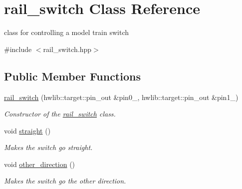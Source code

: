\hypertarget{classrail__switch}{}\section{rail\+\_\+switch Class Reference}
\label{classrail__switch}


class for controlling a model train switch  




{\ttfamily \#include $<$rail\+\_\+switch.\+hpp$>$}

\subsection*{Public Member Functions}
\begin{DoxyCompactItemize}
\item 
\hyperlink{classrail__switch_a6104011a15d2d10247fd72a7786f5498}{rail\+\_\+switch} (hwlib\+::target\+::pin\+\_\+out \&pin0\+\_\+, hwlib\+::target\+::pin\+\_\+out \&pin1\+\_\+)
\begin{DoxyCompactList}\small\item\em Constructor of the \hyperlink{classrail__switch}{rail\+\_\+switch} class. \end{DoxyCompactList}\item 
void \hyperlink{classrail__switch_af6eb3f3e9dfe74d59d51d7b1d15a0e36}{straight} ()
\begin{DoxyCompactList}\small\item\em Makes the switch go straight. \end{DoxyCompactList}\item 
void \hyperlink{classrail__switch_afbd68a5d9669f2bb67df86c51f9d478b}{other\+\_\+direction} ()
\begin{DoxyCompactList}\small\item\em Makes the switch go the other direction. \end{DoxyCompactList}\end{DoxyCompactItemize}
